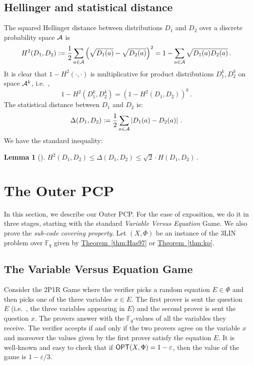 \documentclass[10pt]{article}
\newtheorem{lemma}[theorem]{Lemma}
\theoremstyle{definition}
\providecommand{\ie}{i.e.\ }
\numberwithin{equation}{section}
\newcommand{\expref}[2]{\texorpdfstring{\hyperref[#2]{#1~\ref{#2}}}{#1~\ref{#2}}}
\newcommand\F{\mathbb{F}}
\DeclareMathOperator\OPT{{\sf OPT}}
\newcommand{\eps}{\varepsilon}
\begin{document}
%
%
%
%


\setcounter{subsection}{4}\setcounter{theorem}{11}
\subsection{Hellinger and statistical distance}

The squared Hellinger distance between distributions $D_1$ and $D_2$ over a discrete probability space
${\cal A}$ is
\[
H^2(D_1,D_2) := \frac{1}{2} \sum_{a\in {\cal A}}\left(\sqrt{D_1(a)}
  - \sqrt{D_2(a)}\right)^2 = 1 - \sum_{a\in {\cal A}}\sqrt{D_1(a)
  D_2(a)}\,.
\]
It is clear that $1-H^2(\cdot , \cdot)$ is multiplicative for product distributions $D_1^k, D_2^k$ on space
${\cal A}^k$, \ie,
  $$ 1-H^2(D_1^k, D_2^k) =  (1-H^2(D_1,D_2))^k\,.   $$
The statistical distance between $D_1$ and $D_2$ is:
$$\Delta(D_1,D_2) :=  \frac{1}{2} \sum_{a\in {\cal A}}\left|D_1(a) - D_2(a)\right|\,.$$
We have the standard inequality:
\begin{lemma}[\cite{Pol}]\label{p:Hellinger} 
$\displaystyle H^2(D_1,D_2) \leq \Delta(D_1,D_2) \leq \sqrt{2} \cdot H(D_1,D_2)\,.$
\end{lemma}









\section{The Outer PCP}\label{sec:outer}
In this section, we describe our Outer PCP\@. For the ease of exposition, we do it in three stages,
starting with the standard \emph{Variable Versus Equation} Game. We also prove the \emph{sub-code covering property}.
Let $(X, \Phi)$ be an instance of the 3LIN problem over $\F_q$ given by \expref{Theorem}{thm:Has97}
or \expref{Theorem}{thm:kp}.


\subsection{The Variable Versus Equation Game}

Consider the 2P1R Game where the verifier picks a random equation $E \in \Phi$ and then picks one of the three
variables $x \in E$. The first prover is sent the question $E$ (\ie, the three variables appearing in $E$)
and the second prover is sent the question $x$. The provers answer with the $\F_q$-values of all the variables
they receive.
The verifier accepts if and only if the two provers agree on the variable $x$ and moreover
the values given by the first prover
      satisfy the equation $E$. It is well-known and easy to check that
if $\OPT(X,\Phi) = 1-\eps$, then the value of the game is $1- {\eps}/{3}$.
\end{document}
